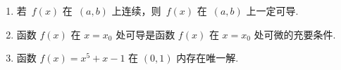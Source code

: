 \documentclass[twocolumn,landscape,UTF8]{ctexart}
\begin{document}
\begin{enumerate}
%			
%
%
\end{enumerate}


\begin{enumerate}%
			
\item 若~$f(x)$ 在~$(a,b)$ 上连续，则~$f(x)$ 在~$(a,b)$ 上一定可导. \pdans{$\times$}%
\item 函数 $f(x)$ 在 $x=x_0$ 处可导是函数 $f(x)$ 在 $x=x_0$ 处可微的充要条件.\pdans{$\surd$}%
\item 函数 $f(x)=x^5+x-1$ 在 $(0,1)$ 内存在唯一解.\pdans{$\surd$}%
\end{enumerate}
\end{document}
